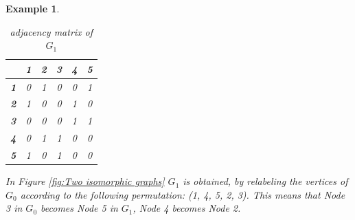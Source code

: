 \documentclass[12pt,a4paper]{article}
\newtheorem{exa}[thm]{Example}
\begin{document}
\begin{exa}
\begin{table}[!htb]
\begin{minipage}{.5\linewidth}
		\begin{tabular}{|c|c|c|c|c|c|}
			\hline 
			& \textbf{1} & \textbf{2} & \textbf{3} & \textbf{4} & \textbf{5} \\ 
			\hline 
			\textbf{1} & 0 & 1 & 0 & 0 & 1 \\ 
			\hline 
			\textbf{2} & 1 & 0 & 0 & 1 & 0 \\ 
			\hline 
			\textbf{3} & 0 & 0 & 0 & 1 & 1 \\ 
			\hline 
			\textbf{4} & 0 & 1 & 1 & 0 & 0 \\ 
			\hline 
			\textbf{5} & 1 & 0 & 1 & 0 & 0 \\ 
			\hline 
		\end{tabular}
			\caption{adjacency matrix of $G_1$}
	\end{minipage} 
\end{table}

In Figure \ref{fig:Two isomorphic graphs} $G_1$ is obtained, by relabeling the vertices of $G_0$ according to the following permutation: (1, 4, 5, 2, 3). This means that Node 3 in $G_0$ becomes Node 5 in $G_1$, Node 4 becomes Node 2. 
\end{exa}
\end{document}
